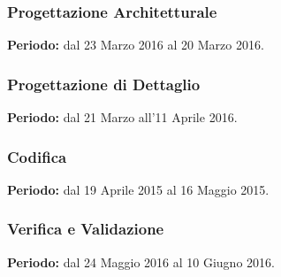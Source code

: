 \subsubsection{Progettazione Architetturale}
\textbf{Periodo:} dal 23 Marzo 2016 al 20 Marzo 2016. 
\subsubsection{Progettazione di Dettaglio}
\textbf{Periodo:} dal 21 Marzo all'11 Aprile 2016.
\subsubsection{Codifica}
\textbf{Periodo:} dal 19 Aprile 2015 al 16 Maggio 2015. 
\subsubsection{Verifica e Validazione}
\textbf{Periodo:} dal 24 Maggio 2016 al 10 Giugno 2016. 